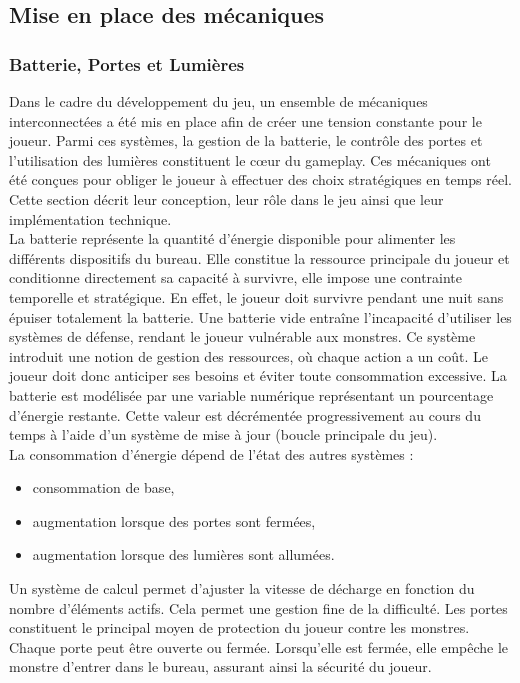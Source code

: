 \documentclass[11pt, a4paper]{article}
\begin{document}
\subsection{Mise en place des mécaniques}
\subsubsection{Batterie, Portes et Lumières}

Dans le cadre du développement du jeu, un ensemble de mécaniques interconnectées a été mis en place afin de créer une tension constante pour le joueur. Parmi ces systèmes, la gestion de la batterie, le contrôle des portes et l’utilisation des lumières constituent le cœur du gameplay. Ces mécaniques ont été conçues pour obliger le joueur à effectuer des choix stratégiques en temps réel. Cette section décrit leur conception, leur rôle dans le jeu ainsi que leur implémentation technique.\\ 

La batterie représente la quantité d’énergie disponible pour alimenter les différents dispositifs du bureau. Elle constitue la ressource principale du joueur et conditionne directement sa capacité à survivre, elle impose une contrainte temporelle et stratégique. En effet, le joueur doit survivre pendant une nuit sans épuiser totalement la batterie. Une batterie vide entraîne l’incapacité d’utiliser les systèmes de défense, rendant le joueur vulnérable aux monstres. Ce système introduit une notion de gestion des ressources, où chaque action a un coût. Le joueur doit donc anticiper ses besoins et éviter toute consommation excessive. La batterie est modélisée par une variable numérique représentant un pourcentage d’énergie restante. Cette valeur est décrémentée progressivement au cours du temps à l’aide d’un système de mise à jour (boucle principale du jeu).\\

La consommation d’énergie dépend de l’état des autres systèmes :
\begin{itemize}
    \item consommation de base,
    \item augmentation lorsque des portes sont fermées,
    \item augmentation lorsque des lumières sont allumées.
\end{itemize}
\newpage
Un système de calcul permet d’ajuster la vitesse de décharge en fonction du nombre d’éléments actifs. Cela permet une gestion fine de la difficulté. Les portes constituent le principal moyen de protection du joueur contre les monstres. Chaque porte peut être ouverte ou fermée. Lorsqu’elle est fermée, elle empêche le monstre d’entrer dans le bureau, assurant ainsi la sécurité du joueur.\\
\end{document}
